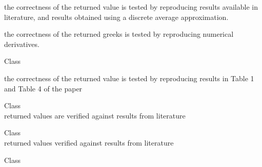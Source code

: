 \begin{DoxyRefList}
\begin{DoxyItemize}
\item the correctness of the returned value is tested by reproducing results available in literature, and results obtained using a discrete average approximation.
\item the correctness of the returned greeks is tested by reproducing numerical derivatives.
\end{DoxyItemize}
\item[Class \doxylink{class_quant_lib_1_1_analytic_continuous_geometric_average_price_asian_heston_engine}{Quant\+Lib\+::Analytic\+Continuous\+Geometric\+Average\+Price\+Asian\+Heston\+Engine} ]\hfill \\
\label{test__test000004}%
%

\begin{DoxyItemize}
\item the correctness of the returned value is tested by reproducing results in Table 1 and Table 4 of the paper
\end{DoxyItemize}
\item[Class \doxylink{class_quant_lib_1_1_analytic_continuous_partial_fixed_lookback_engine}{Quant\+Lib\+::Analytic\+Continuous\+Partial\+Fixed\+Lookback\+Engine} ]\hfill \\
\label{test__test000130}%
%
returned values are verified against results from literature  
\item[Class \doxylink{class_quant_lib_1_1_analytic_continuous_partial_floating_lookback_engine}{Quant\+Lib\+::Analytic\+Continuous\+Partial\+Floating\+Lookback\+Engine} ]\hfill \\
\label{test__test000131}%
%
returned values verified against results from literature  
\item[Class \doxylink{class_quant_lib_1_1_analytic_digital_american_engine}{Quant\+Lib\+::Analytic\+Digital\+American\+Engine} ]\hfill \\
\label{test__test000137}%
%


\end{DoxyRefList}
